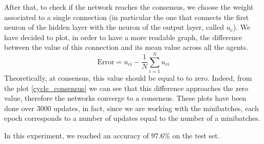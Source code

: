 \documentclass[a4paper,11pt,oneside]{book}
\begin{document}
\bigskip

After that, to check if the network reaches the consensus, we choose the weight associated to a single connection (in particular the one that connects the first neuron of the hidden layer with the neuron of the output layer, called $u_c$). We have decided to plot, in order to have a more readable graph, the difference between the value of this connection and its mean value across all the agents.
\begin{equation}
\text{Error} = u_{ci} - \frac{1}{N}\sum_{i=1}^N u_{ci}
\end{equation}
Theoretically, at consensus, this value should be equal to to zero. Indeed, from the plot \ref{cycle_consensus} we can see that this difference approaches the zero value, therefore the networks converge to a consensus.  These plots have been done over $3000$ updates, in fact, since we are working with the minibatches, each epoch corresponds to a number of updates equal to the number of a minibatches.

\bigskip
In this experiment, we reached an accuracy of $97.6\%$ on the test set.
\end{document}
